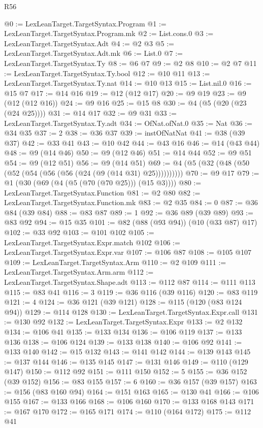 \begin{lexlean}{R56}
\begin{coremodule}
@0 := LexLeanTarget.TargetSyntax.Program
@1 := LexLeanTarget.TargetSyntax.Program.mk
@2 := List.cons.{0}
@3 := LexLeanTarget.TargetSyntax.Adt
@4 := @2 @3
@5 := LexLeanTarget.TargetSyntax.Adt.mk
@6 := List.{0}
@7 := LexLeanTarget.TargetSyntax.Ty
@8 := @6 @7
@9 := @2 @8
@10 := @2 @7
@11 := LexLeanTarget.TargetSyntax.Ty.bool
@12 := @10 @11
@13 := LexLeanTarget.TargetSyntax.Ty.nat
@14 := @10 @13
@15 := List.nil.{0}
@16 := @15 @7
@17 := @14 @16
@19 := @12 (@12 @17)
@20 := @9 @19
@23 := @9 (@12 (@12 @16))
@24 := @9 @16
@25 := @15 @8
@30 := @4 (@5 (@20 (@23 (@24 @25))))
@31 := @14 @17
@32 := @9 @31
@33 := LexLeanTarget.TargetSyntax.Ty.adt
@34 := OfNat.ofNat.{0}
@35 := Nat
@36 := @34 @35
@37 := 2
@38 := @36 @37
@39 := instOfNatNat
@41 := @38 (@39 @37)
@42 := @33 @41
@43 := @10 @42
@44 := @43 @16
@46 := @14 (@43 @44)
@48 := @9 (@14 @46)
@50 := @9 (@12 @46)
@51 := @14 @44
@52 := @9 @51
@54 := @9 (@12 @51)
@56 := @9 (@14 @51)
@69 := @4 (@5 (@32 (@48 (@50 (@52 (@54 (@56 (@56 (@24 (@9 (@14 @31) @25))))))))))
@70 := @9 @17
@79 := @1 (@30 (@69 (@4 (@5 (@70 (@70 @25))) (@15 @3))))
@80 := LexLeanTarget.TargetSyntax.Function
@81 := @2 @80
@82 := LexLeanTarget.TargetSyntax.Function.mk
@83 := @2 @35
@84 := 0
@87 := @36 @84 (@39 @84)
@88 := @83 @87
@89 := 1
@92 := @36 @89 (@39 @89)
@93 := @83 @92
@94 := @15 @35
@101 := @82 (@88 (@93 @94)) (@10 (@33 @87) @17)
@102 := @33 @92
@103 := @101 @102
@105 := LexLeanTarget.TargetSyntax.Expr.match @102
@106 := LexLeanTarget.TargetSyntax.Expr.var
@107 := @106 @87
@108 := @105 @107
@109 := LexLeanTarget.TargetSyntax.Arm
@110 := @2 @109
@111 := LexLeanTarget.TargetSyntax.Arm.arm
@112 := LexLeanTarget.TargetSyntax.Shape.adt
@113 := @112 @87
@114 := @111 @113
@115 := @83 @41
@116 := 3
@119 := @36 @116 (@39 @116)
@120 := @83 @119
@121 := 4
@124 := @36 @121 (@39 @121)
@128 := @115 (@120 (@83 @124 @94))
@129 := @114 @128
@130 := LexLeanTarget.TargetSyntax.Expr.call
@131 := @130 @92
@132 := LexLeanTarget.TargetSyntax.Expr
@133 := @2 @132
@134 := @106 @41
@135 := @133 @134
@136 := @106 @119
@137 := @133 @136
@138 := @106 @124
@139 := @133 @138
@140 := @106 @92
@141 := @133 @140
@142 := @15 @132
@143 := @141 @142
@144 := @139 @143
@145 := @137 @144
@146 := @135 @145
@147 := @131 @146
@149 := @110 (@129 @147)
@150 := @112 @92
@151 := @111 @150
@152 := 5
@155 := @36 @152 (@39 @152)
@156 := @83 @155
@157 := 6
@160 := @36 @157 (@39 @157)
@163 := @156 (@83 @160 @94)
@164 := @151 @163
@165 := @130 @41
@166 := @106 @155
@167 := @133 @166
@168 := @106 @160
@170 := @133 @168 @143
@171 := @167 @170
@172 := @165 @171
@174 := @110 (@164 @172)
@175 := @112 @41

\end{coremodule}
\end{lexlean}
